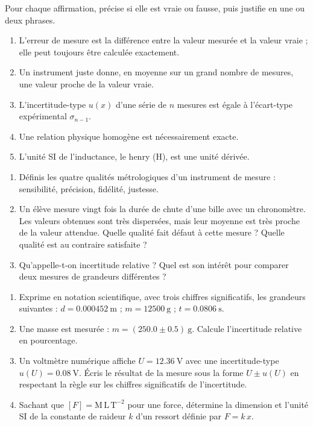 \documentclass[11pt]{article}
\newcommand{\cle}[1]{{\popxbold\color{popdark}#1}}
\begin{document}
\begin{exercice}
Pour chaque affirmation, précise si elle est vraie ou fausse, puis justifie en une ou deux phrases.
\begin{enumerate}
    \item L'erreur de mesure est la différence entre la valeur mesurée et la valeur vraie ; elle peut toujours être calculée exactement.
    \item Un instrument \cle{juste} donne, en moyenne sur un grand nombre de mesures, une valeur proche de la valeur vraie.
    \item L'incertitude-type $u(x)$ d'une série de $n$ mesures est égale à l'écart-type expérimental $\sigma_{n-1}$.
    \item Une relation physique homogène est nécessairement exacte.
    \item L'unité SI de l'inductance, le henry (H), est une unité dérivée.
\end{enumerate}
\end{exercice}

\begin{exercice}
\begin{enumerate}
    \item Définis les quatre qualités métrologiques d'un instrument de mesure : \cle{sensibilité}, \cle{précision}, \cle{fidélité}, \cle{justesse}.
    \item Un élève mesure vingt fois la durée de chute d'une bille avec un chronomètre. Les valeurs obtenues sont très dispersées, mais leur moyenne est très proche de la valeur attendue. Quelle qualité fait défaut à cette mesure ? Quelle qualité est au contraire satisfaite ?
    \item Qu'appelle-t-on \cle{incertitude relative} ? Quel est son intérêt pour comparer deux mesures de grandeurs différentes ?
\end{enumerate}
\end{exercice}

\begin{exercice}
\begin{enumerate}
    \item Exprime en notation scientifique, avec trois chiffres significatifs, les grandeurs suivantes : $d = \num{0,000452}~\text{m}$ ; $m = \num{12500}~\text{g}$ ; $t = \num{0,0806}~\text{s}$.
    \item Une masse est mesurée : $m = (\num{250,0} \pm \num{0,5})~\text{g}$. Calcule l'incertitude relative en pourcentage.
    \item Un voltmètre numérique affiche $U = \num{12,36}~\text{V}$ avec une incertitude-type $u(U) = \num{0,08}~\text{V}$. Écris le résultat de la mesure sous la forme $U \pm u(U)$ en respectant la règle sur les chiffres significatifs de l'incertitude.
    \item Sachant que $[F] = \text{M}\,\text{L}\,\text{T}^{-2}$ pour une force, détermine la dimension et l'unité SI de la constante de raideur $k$ d'un ressort définie par $F = k\,x$.
\end{enumerate}
\end{exercice}
\end{document}

